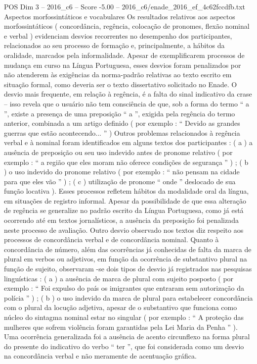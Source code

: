 \begin{textsample}{POS Dim 3 – 2016\_c6 – Score -5.00 – 2016\_c6/enade\_2016\_ef\_4c62fccdfb.txt}
Aspectos morfossintáticos e vocabulares Os resultados relativos aos aspectos morfossintáticos ( concordância, regência, colocação de pronomes, flexão nominal e verbal ) evidenciam desvios recorrentes no desempenho dos participantes, relacionados ao seu processo de formação e, principalmente, a hábitos da oralidade, marcados pela informalidade.
Apesar de exemplificarem processos de mudança em curso na Língua Portuguesa, esses desvios foram penalizados por não atenderem às exigências da norma-padrão relativas ao texto escrito em situação formal, como deveria ser o texto dissertativo solicitado no Enade.
O desvio mais frequente, em relação à regência, é a falta do sinal indicativo da crase – isso revela que o usuário não tem consciência de que, sob a forma do termo “ a ”, existe a presença de uma preposição “ a ”, exigida pela regência do termo anterior, combinada a um artigo definido ( por exemplo : “ Devido as grandes guerras que estão acontecendo... ” ) Outros problemas relacionados à regência verbal e à nominal foram identificados em alguns textos dos participantes : ( a ) a ausência de preposição ou seu uso indevido antes de pronome relativo ( por exemplo : “ a região que eles moram não oferece condições de segurança ” ) ; ( b ) o uso indevido do pronome relativo ( por exemplo : “ não pensam na cidade para que eles vão ” ) ; ( c ) utilização de pronome “ onde ” deslocado de sua função locativa ).
Esses processos refletem hábitos da modalidade oral da língua, em situações de registro informal.
Apesar da possibilidade de que essa alteração de regência se generalize no padrão escrito da Língua Portuguesa, como já está ocorrendo até em textos jornalísticos, a ausência da preposição foi penalizada neste processo de avaliação.
Outro desvio observado nos textos diz respeito aos processos de concordância verbal e de concordância nominal.
Quanto à concordância de número, além das ocorrências já conhecidas de falta da marca de plural em verbos ou adjetivos, em função da ocorrência de substantivo plural na função de sujeito, observaram -se dois tipos de desvio já registrados nas pesquisas linguísticas : ( a ) a ausência de marca de plural com sujeito posposto ( por exemplo : “ Foi expulso do país os imigrantes que entraram sem autorização da polícia ” ) ; ( b ) o uso indevido da marca de plural para estabelecer concordância com o plural da locução adjetiva, apesar de o substantivo que funciona como núcleo do sintagma nominal estar no singular ( por exemplo : “ A proteção das mulheres que sofrem violência foram garantidas pela Lei Maria da Penha ” ).
Uma ocorrência generalizada foi a ausência de acento circunflexo na forma plural do presente do indicativo do verbo “ ter ”, que foi considerada como um desvio na concordância verbal e não meramente de acentuação gráfica.

\end{textsample}
